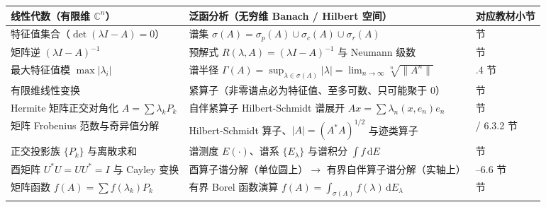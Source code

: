 \documentclass[11pt,a4paper]{article}
\newcounter{none}
\begin{document}
{\def\LTcaptype{none} %
{\small\renewcommand{\arraystretch}{1.38}\setlength{\tabcolsep}{5pt}
\begin{longtable}[]{@{}
  >{\raggedright\arraybackslash}p{}
  >{\raggedright\arraybackslash}p{}
  >{\raggedright\arraybackslash}p{}@{}}
\toprule\noalign{}
\rowcolor{AccentSoft}
\begin{minipage}[b]{\linewidth}\raggedright
线性代数（有限维 \(\mathbb{C}^n\)）
\end{minipage} & \begin{minipage}[b]{\linewidth}\raggedright
泛函分析（无穷维 Banach / Hilbert 空间）
\end{minipage} & \begin{minipage}[b]{\linewidth}\raggedright
对应教材小节
\end{minipage} \\
\midrule\noalign{}
\endhead
\bottomrule\noalign{}
\endlastfoot
特征值集合（\(\det(\lambda I - A)=0\)） & 谱集 \(\sigma(A) = \sigma_p(A) \cup \sigma_c(A) \cup \sigma_r(A)\) & 6.1 节 \\
矩阵逆 \((\lambda I - A)^{-1}\) & 预解式 \(R(\lambda, A) = (\lambda I - A)^{-1}\) 与 Neumann 级数 & 6.1 节 \\
最大特征值模 \(\max \lvert \lambda_i \rvert\) & 谱半径 \(\Gamma(A) = \sup_{\lambda \in \sigma(A)} \lvert \lambda \rvert = \lim_{n\to\infty}\sqrt[n]{\lVert A^n \rVert}\) & 6.1.4 节 \\
有限维线性变换 & 紧算子（非零谱点必为特征值、至多可数、只可能聚于 \(0\)） & 6.2 节 \\
Hermite 矩阵正交对角化 \(A=\sum \lambda_k P_k\) & 自伴紧算子 Hilbert-Schmidt 谱展开 \(Ax = \sum \lambda_n (x,e_n)e_n\) & 6.3 节 \\
矩阵 Frobenius 范数与奇异值分解 & Hilbert-Schmidt 算子、\(\lvert A \rvert = (A^*A)^{1/2}\) 与迹类算子 & 5.2 / 6.3.2 节 \\
正交投影族 \(\{P_k\}\) 与离散求和 & 谱测度 \(E(\cdot)\)、谱系 \(\{E_\lambda\}\) 与谱积分 \(\int f \,\mathrm{d}E\) & 6.4 节 \\
酉矩阵 \(U^*U = UU^* = I\) 与 Cayley 变换 & 酉算子谱分解（单位圆上）\(\to\) 有界自伴算子谱分解（实轴上） & 6.5--6.6 节 \\
矩阵函数 \(f(A) = \sum f(\lambda_k) P_k\) & 有界 Borel 函数演算 \(f(A) = \int_{\sigma(A)} f(\lambda)\,\mathrm{d}E_\lambda\) & 6.6 节 \\
\end{longtable}
}
}
\end{document}
